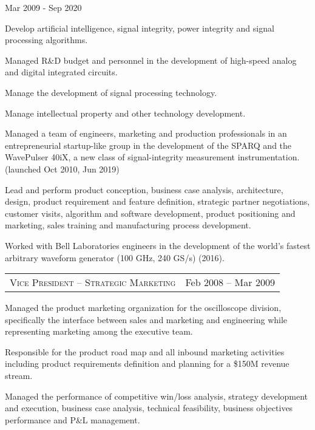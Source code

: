 \documentclass[10pt,letterpaper]{extarticle}
\makeatletter
\newcommand{\headerrow}[2]
{\begin{tabular*}{\linewidth}{l@{\extracolsep{\fill}}r}
	#1 &
	#2 \\
\end{tabular*}}
\makeatother
\begin{document}
		{Mar 2009 - Sep 2020}\vspace{-\topsep}\begin{itemize*}
		\item Develop artificial intelligence, signal integrity, power integrity and signal processing algorithms.
		\item Managed R\&D budget and personnel in the development of high-speed analog and digital integrated circuits.
		\item Manage the development of signal processing technology.
		\item Manage intellectual property and other technology development.
		\item Managed a team of engineers, marketing and production professionals in an
		entrepreneurial startup-like group in the development of the SPARQ and the WavePulser 40iX, a new class of 
		signal-integrity measurement instrumentation. (launched Oct 2010, Jun 2019)
		\item Lead and perform product conception, business case analysis, architecture,
		design, product requirement and feature definition, strategic partner negotiations, 
		customer visits, algorithm and software development, product positioning and 
		marketing, sales training and manufacturing process development. 
		\item Worked with Bell Laboratories engineers in the development of the world's fastest arbitrary waveform generator (100 GHz, 240 GS/s) (2016).
	\end{itemize*}\vspace{-\topsep}
	\headerrow
	{\large \textsc{Vice President – Strategic Marketing}}
	{Feb 2008 – Mar 2009}\vspace{-\topsep}\begin{itemize*}
		\item Managed the product marketing organization for the oscilloscope division, 
		specifically the interface between sales and marketing  and engineering 
		while representing  marketing among the executive team.
		\item Responsible for the product road map and all inbound marketing activities 
		including product requirements definition and planning for a \$150M revenue stream.
		\item Managed the performance of competitive win/loss analysis, strategy development 
		and execution, business case analysis, technical feasibility, business objectives 
		performance and P\&L management.
	\end{itemize*}\vspace{-\topsep}
\end{document}

